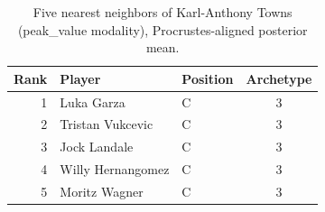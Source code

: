 \begin{table}[htbp]
  \centering\small
  \begin{tabular}{rllc}
    \toprule
    Rank & Player & Position & Archetype \\
    \midrule
    1 & Luka Garza & C & 3 \\
    2 & Tristan Vukcevic & C & 3 \\
    3 & Jock Landale & C & 3 \\
    4 & Willy Hernangomez & C & 3 \\
    5 & Moritz Wagner & C & 3 \\
    \bottomrule
  \end{tabular}
  \caption{Five nearest neighbors of Karl-Anthony Towns (peak_value modality), Procrustes-aligned posterior mean.}
  \label{tab:Karl_Anthony_Towns_neighbors_peak_value}
\end{table}

